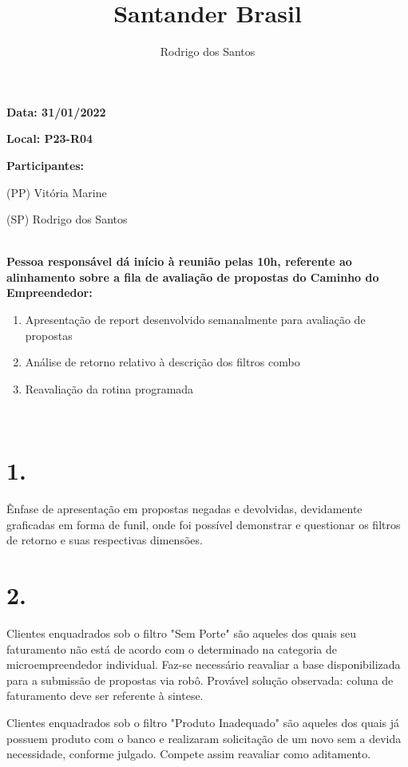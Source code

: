 \documentclass[a4paper, 11pt]{article}
\title{Santander Brasil}
\author{Rodrigo dos Santos}
\begin{document}
\pagestyle{style1}

\textbf{Data: 31/01/2022} %

\textbf{Local: P23-R04} %

\textbf{Participantes:} 
\begin{description}
\item (PP) Vitória Marine
\item (SP) Rodrigo dos Santos

\end{description}

\makebox[\linewidth]{\rule{\linewidth}{0.4pt}}\\
\textbf{Pessoa responsável dá início à reunião pelas 10h, referente ao alinhamento sobre a fila de avaliação de propostas do Caminho do Empreendedor:} 
\begin{enumerate}

\item Apresentação de report desenvolvido semanalmente para avaliação de propostas


\item Análise de retorno relativo à descrição dos filtros combo


\item Reavaliação da rotina programada




\end{enumerate}
\makebox[\linewidth]{\rule{\linewidth}{0.4pt}}\\

\section*{1.}
Ênfase de apresentação em propostas negadas e devolvidas, devidamente graficadas em forma de funil, onde foi possível demonstrar e questionar os filtros de retorno e suas respectivas dimensões.

\section*{2.}
Clientes enquadrados sob o filtro "Sem Porte" são aqueles dos quais seu faturamento não está de acordo com o determinado na categoria de microempreendedor individual. Faz-se necessário reavaliar a base disponibilizada para a submissão de propostas via robô. Provável solução observada: coluna de faturamento deve ser referente à sintese.

Clientes enquadrados sob o filtro "Produto Inadequado" são aqueles dos quais já possuem produto com o banco e realizaram solicitação de um novo sem a devida necessidade, conforme julgado. Compete assim reavaliar como aditamento.
\end{document}

